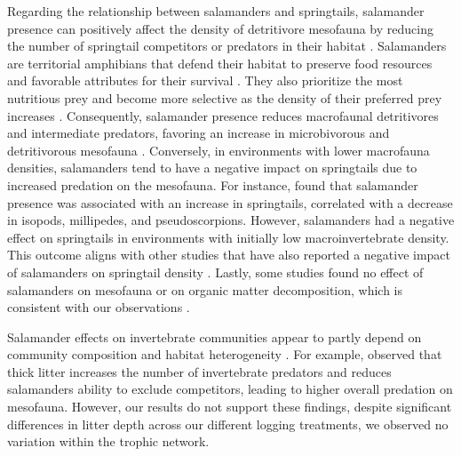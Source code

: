 Regarding the relationship between salamanders and springtails, salamander presence can positively affect the density of detritivore mesofauna by reducing the number of springtail competitors or predators in their habitat \citep{Wyman1998Experimentalassessment,Rooney2000impactsalamander,Walton2005Contrastingeffects,Walton2006Salamandersforestfloor}. 
Salamanders are territorial amphibians that defend their habitat to preserve food resources and favorable attributes for their survival \citep{Gall2003BehavioralInteractions,Hickerson2004Behavioralinteractions,Hickerson2012Interactionsforestfloor}. 
They also prioritize the most nutritious prey and become more selective as the density of their preferred prey increases \citep{Jaeger1981Foragingtactics,Jaeger1982ForagingTactics}. 
Consequently, salamander presence reduces macrofaunal detritivores and intermediate predators, favoring an increase in microbivorous and detritivorous mesofauna \citep{Rooney2000impactsalamander,Walton2005Contrastingeffects,Walton2006Salamandersforestfloor}. 
Conversely, in environments with lower macrofauna densities, salamanders tend to have a negative impact on springtails due to increased predation on the mesofauna. 
For instance, \cite{Walton2006Salamandersforestfloor} found that salamander presence was associated with an increase in springtails, correlated with a decrease in isopods, millipedes, and pseudoscorpions.  
However, salamanders had a negative effect on springtails in environments with initially low macroinvertebrate density. 
This outcome aligns with other studies that have also reported a negative impact of salamanders on springtail density \citep{Hickerson2017Easternredbacked}. 
Lastly, some studies found no effect of salamanders on mesofauna or on organic matter decomposition, which is consistent with our observations \citep{Hocking2013Effectsexperimental,Hocking2014Effectsredbacked}.

Salamander effects on invertebrate communities appear to partly depend on community composition and habitat heterogeneity \citep{MichaelWalton2005Salamandersforestfloor,Walton2006Salamandersforestfloor,Walton2013Topdownregulation,Best2014trophicrole}. 
For example, \cite{Walton2013Topdownregulation} observed that thick litter increases the number of invertebrate predators and reduces salamanders ability to exclude competitors, leading to higher overall predation on mesofauna. 
However, our results do not support these findings, despite significant differences in litter depth across our different logging treatments, we observed no variation within the trophic network.


